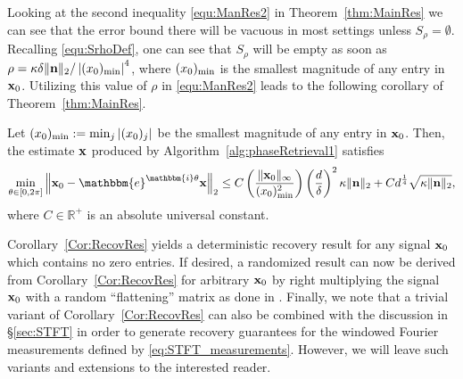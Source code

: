 Looking at the second inequality \eqref{equ:ManRes2} in Theorem~\ref{thm:MainRes} we can see that the error bound there will be vacuous in most settings unless $S_\rho = \emptyset$.  Recalling \eqref{equ:SrhoDef}, one can see that $S_\rho$ will be empty as soon as $\rho = \kappa \delta \| \mathbf n \|_2 / \left| (x_0)_{\rm min} \right|^4$, where $(x_0)_{\rm min}$ is the smallest magnitude of any entry in $\mathbf x_0$.  Utilizing this value of $\rho$ in \eqref{equ:ManRes2} leads to the following corollary of Theorem~\ref{thm:MainRes}.

\begin{cor}
Let $(x_0)_{\rm min} := \min_j |(x_0)_j|$ be the smallest magnitude of any entry in $\mathbf x_0$.  Then, the estimate $\mathbf x$ produced by Algorithm~\ref{alg:phaseRetrieval1} satisfies 
\[ \min_{\theta \in [0, 2 \pi]} \left\Vert  \x_0 - \mathbbm{e}^{\mathbbm{i} \theta} \x \right\Vert_2 \leq C \left( \frac{\Vert \x_0 
        \Vert_{\infty}}{(x_0)^2_{\rm min}} \right) \left( \frac{d}{\delta} \right)^2 \kappa \| \n \|_2 + C d^{\frac{1}{4}} \sqrt{\kappa \| \n \|_2 },\]
where $C \in \mathbb{R}^+$ is an absolute universal constant.  
\label{Cor:RecovRes}
\end{cor}

Corollary~\ref{Cor:RecovRes} yields a deterministic recovery result for any signal $\mathbf x_0$ which contains no zero entries.  If desired, a randomized result can now be derived from Corollary~\ref{Cor:RecovRes} for arbitrary $\mathbf x_0$ by right multiplying the signal $\mathbf x_0$ %
with a random ``flattening'' matrix as done in \cite{IVW2015_FastPhase}.   Finally, we note that a trivial variant of Corollary~\ref{Cor:RecovRes} can also be combined with the discussion in \S \ref{sec:STFT} in order to generate recovery guarantees for the windowed Fourier measurements defined by \eqref{eq:STFT_measurements}.  However, we will leave such variants and extensions to the interested reader.

